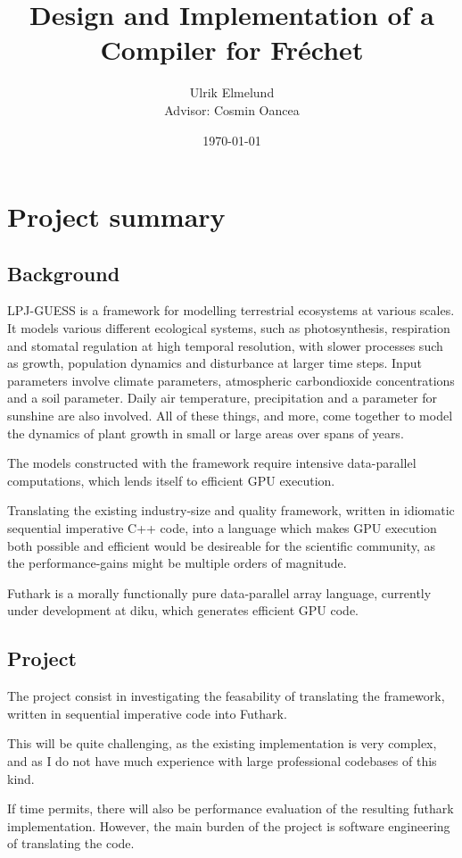 
\author{Ulrik Elmelund\\ {\small{} Advisor: Cosmin Oancea}}
\date{\today}
\title{Design and Implementation of a Compiler for Fréchet}

\section*{Project summary}
\subsection*{Background}
LPJ-GUESS is a framework for modelling terrestrial ecosystems at various scales.\cite{smith2001lpj} It models various different ecological systems, such as photosynthesis, respiration and stomatal regulation at high temporal resolution, with slower processes such as growth, population dynamics and disturbance at larger time steps. Input parameters involve climate parameters, atmospheric carbondioxide concentrations and a soil parameter. Daily air temperature, precipitation and a parameter for sunshine are also involved. All of these things, and more, come together to model the dynamics of plant growth in small or large areas over spans of years.

The models constructed with the framework require intensive data-parallel computations, which lends itself to efficient GPU execution.

Translating the existing industry-size and quality framework, written in idiomatic sequential imperative C++ code, into a language which makes GPU execution both possible and efficient would be desireable for the scientific community, as the performance-gains might be multiple orders of magnitude.

Futhark is a morally functionally pure data-parallel array language, currently under development at diku, which generates efficient GPU code\cite{futhark}.

\subsection*{Project}
The project consist in investigating the feasability of translating the framework, written in sequential imperative code into Futhark.

This will be quite challenging, as the existing implementation is very complex, and as I do not have much experience with large professional codebases of this kind.

If time permits, there will also be performance evaluation of the resulting futhark implementation. However, the main burden of the project is software engineering of translating the code.

